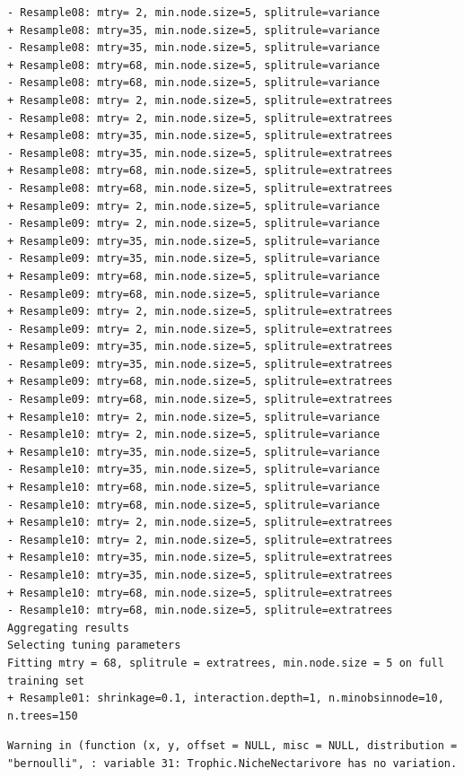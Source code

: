 \documentclass[
  letterpaper,
  DIV=11,
  numbers=noendperiod]{scrartcl}
\begin{document}
\begin{verbatim}
- Resample08: mtry= 2, min.node.size=5, splitrule=variance 
+ Resample08: mtry=35, min.node.size=5, splitrule=variance 
- Resample08: mtry=35, min.node.size=5, splitrule=variance 
+ Resample08: mtry=68, min.node.size=5, splitrule=variance 
- Resample08: mtry=68, min.node.size=5, splitrule=variance 
+ Resample08: mtry= 2, min.node.size=5, splitrule=extratrees 
- Resample08: mtry= 2, min.node.size=5, splitrule=extratrees 
+ Resample08: mtry=35, min.node.size=5, splitrule=extratrees 
- Resample08: mtry=35, min.node.size=5, splitrule=extratrees 
+ Resample08: mtry=68, min.node.size=5, splitrule=extratrees 
- Resample08: mtry=68, min.node.size=5, splitrule=extratrees 
+ Resample09: mtry= 2, min.node.size=5, splitrule=variance 
- Resample09: mtry= 2, min.node.size=5, splitrule=variance 
+ Resample09: mtry=35, min.node.size=5, splitrule=variance 
- Resample09: mtry=35, min.node.size=5, splitrule=variance 
+ Resample09: mtry=68, min.node.size=5, splitrule=variance 
- Resample09: mtry=68, min.node.size=5, splitrule=variance 
+ Resample09: mtry= 2, min.node.size=5, splitrule=extratrees 
- Resample09: mtry= 2, min.node.size=5, splitrule=extratrees 
+ Resample09: mtry=35, min.node.size=5, splitrule=extratrees 
- Resample09: mtry=35, min.node.size=5, splitrule=extratrees 
+ Resample09: mtry=68, min.node.size=5, splitrule=extratrees 
- Resample09: mtry=68, min.node.size=5, splitrule=extratrees 
+ Resample10: mtry= 2, min.node.size=5, splitrule=variance 
- Resample10: mtry= 2, min.node.size=5, splitrule=variance 
+ Resample10: mtry=35, min.node.size=5, splitrule=variance 
- Resample10: mtry=35, min.node.size=5, splitrule=variance 
+ Resample10: mtry=68, min.node.size=5, splitrule=variance 
- Resample10: mtry=68, min.node.size=5, splitrule=variance 
+ Resample10: mtry= 2, min.node.size=5, splitrule=extratrees 
- Resample10: mtry= 2, min.node.size=5, splitrule=extratrees 
+ Resample10: mtry=35, min.node.size=5, splitrule=extratrees 
- Resample10: mtry=35, min.node.size=5, splitrule=extratrees 
+ Resample10: mtry=68, min.node.size=5, splitrule=extratrees 
- Resample10: mtry=68, min.node.size=5, splitrule=extratrees 
Aggregating results
Selecting tuning parameters
Fitting mtry = 68, splitrule = extratrees, min.node.size = 5 on full training set
+ Resample01: shrinkage=0.1, interaction.depth=1, n.minobsinnode=10, n.trees=150 
\end{verbatim}

\begin{verbatim}
Warning in (function (x, y, offset = NULL, misc = NULL, distribution =
"bernoulli", : variable 31: Trophic.NicheNectarivore has no variation.
\end{verbatim}
\end{document}
